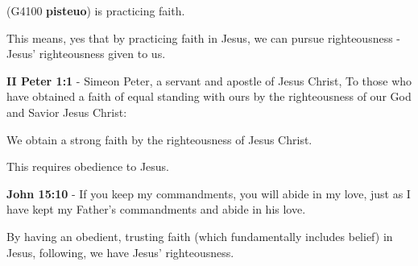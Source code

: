 \documentclass[11pt]{article}
\begin{document}
(G4100 \textbf{pisteuo}) is practicing faith.

This means, yes that by practicing faith in Jesus, we can pursue righteousness - Jesus' righteousness given to us.

\textbf{II Peter 1:1} - Simeon Peter, a servant and apostle of Jesus Christ, To those who have obtained a faith of equal standing with ours by the righteousness of our God and Savior Jesus Christ:

We obtain a strong faith by the righteousness of Jesus Christ.

This requires obedience to Jesus.

\textbf{John 15:10} - If you keep my commandments, you will abide in my love, just as I have kept my Father's commandments and abide in his love.

By having an obedient, trusting faith (which fundamentally includes belief) in Jesus, following, we have Jesus' righteousness.
\end{document}
